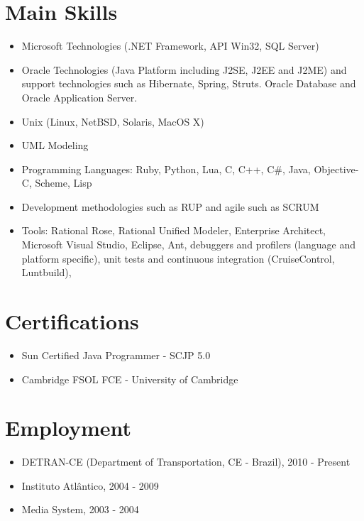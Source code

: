 \documentclass[letterpaper]{article}
\begin{document}
\section*{Main Skills}
\begin{itemize}
  \item Microsoft Technologies (.NET Framework, API Win32, SQL Server)
  \item Oracle Technologies (Java Platform including J2SE, J2EE and J2ME) and support
    technologies such as Hibernate, Spring, Struts.
    Oracle Database and Oracle Application Server.
  \item Unix (Linux, NetBSD, Solaris, MacOS X)
  \item UML Modeling
  \item Programming Languages: Ruby, Python, Lua, C, C++, C\#, Java, Objective-C, Scheme, Lisp
  \item Development methodologies such as RUP and agile such as SCRUM
  \item Tools: Rational Rose, Rational Unified Modeler, Enterprise Architect, Microsoft
Visual Studio, Eclipse, Ant, debuggers and profilers (language and platform
specific), unit tests and continuous integration (CruiseControl, Luntbuild),
\end{itemize}

\section*{Certifications}
\begin{itemize}
  \item Sun Certified Java Programmer - SCJP 5.0
  \item Cambridge FSOL FCE - University of Cambridge
\end{itemize}

\section*{Employment}

\begin{itemize}
\item DETRAN-CE (Department of Transportation, CE - Brazil), 2010 - Present
\item Instituto Atlântico, 2004 - 2009
\item Media System, 2003 - 2004
\end{itemize}
\end{document}
